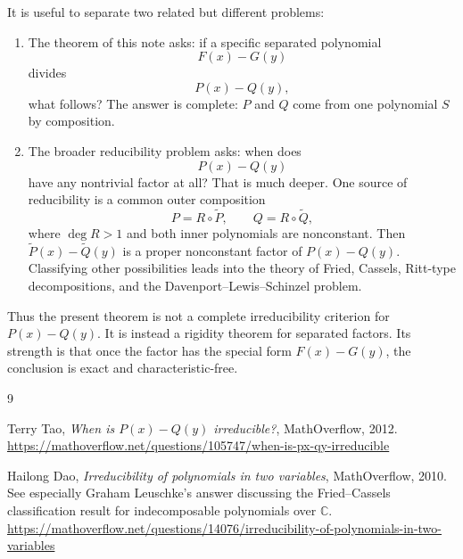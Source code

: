 \documentclass[12pt]{article}
\begin{document}
It is useful to separate two related but different problems:

\begin{enumerate}
    \item The theorem of this note asks: if a specific separated polynomial
    \[
        F(x)-G(y)
    \]
    divides
    \[
        P(x)-Q(y),
    \]
    what follows?  The answer is complete: \(P\) and \(Q\) come from one polynomial \(S\) by composition.

    \item The broader reducibility problem asks: when does
    \[
        P(x)-Q(y)
    \]
    have any nontrivial factor at all? That is much deeper. One source of reducibility is a common outer composition
    \[
        P=R\circ \widetilde P,
        \qquad
        Q=R\circ \widetilde Q,
    \]
    where \(\deg R>1\) and both inner polynomials are nonconstant. Then \(\widetilde P(x)-\widetilde Q(y)\) is a proper nonconstant factor of \(P(x)-Q(y)\). Classifying other possibilities leads into the theory of Fried, Cassels, Ritt-type decompositions, and the Davenport--Lewis--Schinzel problem.
\end{enumerate}

Thus the present theorem is not a complete irreducibility criterion for \(P(x)-Q(y)\).  It is instead a rigidity theorem for separated factors.  Its strength is that once the factor has the special form \(F(x)-G(y)\), the conclusion is exact and characteristic-free.

\begin{thebibliography}{9}

Terry Tao,
\emph{When is \(P(x)-Q(y)\) irreducible?},
MathOverflow, 2012.
\url{https://mathoverflow.net/questions/105747/when-is-px-qy-irreducible}

Hailong Dao,
\emph{Irreducibility of polynomials in two variables},
MathOverflow, 2010.
See especially Graham Leuschke's answer discussing the Fried--Cassels classification result for indecomposable polynomials over \(\mathbb C\).
\url{https://mathoverflow.net/questions/14076/irreducibility-of-polynomials-in-two-variables}

\end{thebibliography}
\end{document}
